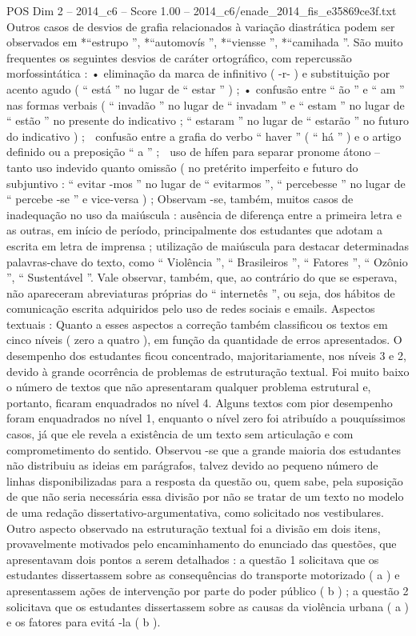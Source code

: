 \begin{textsample}{POS Dim 2 – 2014\_c6 – Score 1.00 – 2014\_c6/enade\_2014\_fis\_e35869ce3f.txt}
Outros casos de desvios de grafia relacionados à variação diastrática podem ser observados em *“estrupo ”, *“automovís ”, *“viensse ”, *“camihada ”.
São muito frequentes os seguintes desvios de caráter ortográfico, com repercussão morfossintática : • eliminação da marca de infinitivo ( -r- ) e substituição por acento agudo ( “ está ” no lugar de “ estar ” ) ; • confusão entre “ ão ” e “ am ” nas formas verbais ( “ invadão ” no lugar de “ invadam ” e “ estam ” no lugar de “ estão ” no presente do indicativo ; “ estaram ” no lugar de “ estarão ” no futuro do indicativo ) ;  confusão entre a grafia do verbo “ haver ” ( “ há ” ) e o artigo definido ou a preposição “ a ” ;  uso de hífen para separar pronome átono – tanto uso indevido quanto omissão ( no pretérito imperfeito e futuro do subjuntivo : “ evitar -mos ” no lugar de “ evitarmos ”, “ percebesse ” no lugar de “ percebe -se ” e vice-versa ) ; Observam -se, também, muitos casos de inadequação no uso da maiúscula : ausência de diferença entre a primeira letra e as outras, em início de período, principalmente dos estudantes que adotam a escrita em letra de imprensa ; utilização de maiúscula para destacar determinadas palavras-chave do texto, como “ Violência ”, “ Brasileiros ”, “ Fatores ”, “ Ozônio ”, “ Sustentável ”.
Vale observar, também, que, ao contrário do que se esperava, não apareceram abreviaturas próprias do “ internetês ”, ou seja, dos hábitos de comunicação escrita adquiridos pelo uso de redes sociais e emails.
Aspectos textuais : Quanto a esses aspectos a correção também classificou os textos em cinco níveis ( zero a quatro ), em função da quantidade de erros apresentados.
O desempenho dos estudantes ficou concentrado, majoritariamente, nos níveis 3 e 2, devido à grande ocorrência de problemas de estruturação textual.
Foi muito baixo o número de textos que não apresentaram qualquer problema estrutural e, portanto, ficaram enquadrados no nível 4.
Alguns textos com pior desempenho foram enquadrados no nível 1, enquanto o nível zero foi atribuído a pouquíssimos casos, já que ele revela a existência de um texto sem articulação e com comprometimento do sentido.
Observou -se que a grande maioria dos estudantes não distribuiu as ideias em parágrafos, talvez devido ao pequeno número de linhas disponibilizadas para a resposta da questão ou, quem sabe, pela suposição de que não seria necessária essa divisão por não se tratar de um texto no modelo de uma redação dissertativo-argumentativa, como solicitado nos vestibulares.
Outro aspecto observado na estruturação textual foi a divisão em dois itens, provavelmente motivados pelo encaminhamento do enunciado das questões, que apresentavam dois pontos a serem detalhados : a questão 1 solicitava que os estudantes dissertassem sobre as consequências do transporte motorizado ( a ) e apresentassem ações de intervenção por parte do poder público ( b ) ; a questão 2 solicitava que os estudantes dissertassem sobre as causas da violência urbana ( a ) e os fatores para evitá -la ( b ).

\end{textsample}
